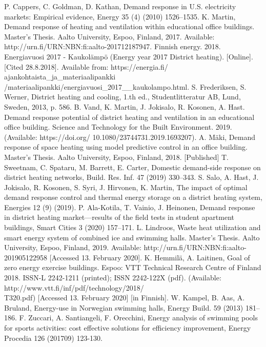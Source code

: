 \documentclass[hyperref]{ctexart}
\begin{document}
\begin{multicols}{2}
\begin{thebibliography}{100}
			 P. Cappers, C. Goldman, D. Kathan, Demand response in U.S. electricity markets: Empirical evidence, Energy 35 (4) (2010) 1526–1535. 
			 K. Martin, Demand response of heating and ventilation within educational office buildings. Master’s Thesis. Aalto University, Espoo, Finland, 2017. Available: http://urn.fi/URN:NBN:fi:aalto-201712187947. 
			 Finnish energy. 2018. Energiavuosi 2017 - Kaukolämpö (Energy year 2017 District heating). [Online]. [Cited 28.8.2018]. Available from: https://energia.fi/ ajankohtaista_ja_materiaalipankki /materiaalipankki/energiavuosi_2017__kaukolampo.html. 
			 S. Frederiksen, S. Werner, District heating and cooling, 1.th ed., Studentlitteratur AB, Lund, Sweden, 2013, p. 586. 
			 B. Vand, K. Martin, J. Jokisalo, R. Kosonen, A. Hast. Demand response potential of district heating and ventilation in an educational office building. Science and Technology for the Built Environment. 2019. (Available: https://doi.org/ 10.1080/23744731.2019.1693207). 
			 A. Mäki, Demand response of space heating using model predictive control in an office building. Master’s Thesis. Aalto University, Espoo, Finland, 2018. [Published] 
			 T. Sweetnam, C. Spataru, M. Barrett, E. Carter, Domestic demand-side response on district heating networks, Build. Res. Inf. 47 (2019) 330–343. 
			 S. Salo, A. Hast, J. Jokisalo, R. Kosonen, S. Syri, J. Hirvonen, K. Martin, The impact of optimal demand response control and thermal energy storage on a district heating system, Energies 12 (9) (2019).
			 P. Ala-Kotila, T. Vainio, J. Heinonen, Demand response in district heating market—results of the field tests in student apartment buildings, Smart Cities 3 (2020) 157–171. 
			 L. Lindroos, Waste heat utilization and smart energy system of combined ice and swimming halls. Master’s Thesis. Aalto University, Espoo, Finland, 2019. Available: http://urn.fi/URN:NBN:fi:aalto-201905122958 [Accessed 13. February 2020]. 
			 K. Hemmilä, A. Laitinen, Goal of zero energy exercise buildings. Espoo: VTT Technical Research Centre of Finland 2018. ISSN-L 2242-1211 (printed); ISSN 2242-122X (pdf). (Available: http://www.vtt.fi/inf/pdf/technology/2018/\\T320.pdf) [Accessed 13. February 2020] [in Finnish]. 
			 W. Kampel, B. Aas, A. Bruland, Energy-use in Norwegian swimming halls, Energy Build. 59 (2013) 181–186. 
			 F. Zuccari, A. Santiangeli, F. Orecchini, Energy analysis of swimming pools for sports activities: cost effective solutions for efficiency improvement, Energy Procedia 126 (201709) 123-130. 

\end{thebibliography}
\end{multicols}
\end{document}
